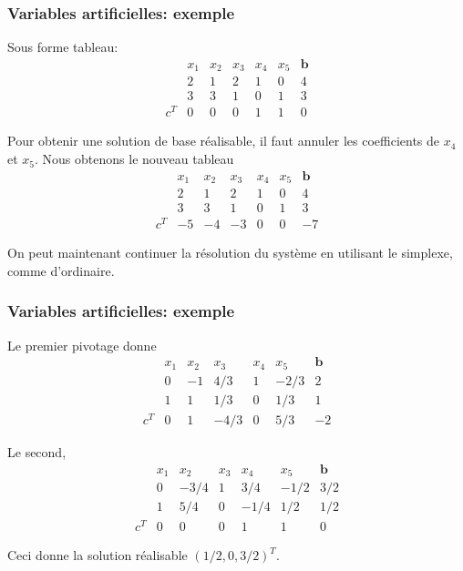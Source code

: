 \documentclass[usepdftitle=false]{beamer}
\def\bb{\boldsymbol{b}}
\begin{document}
\begin{frame}
\frametitle{Variables artificielles: exemple}

Sous forme tableau:
\[
\begin{matrix}
& x_1 & x_2 & x_3 & x_4 & x_5 & \bb \\
& 2 & 1 & 2 & 1 & 0 & 4 \\
& 3 & 3 & 1 & 0 & 1 & 3 \\
c^T & 0 & 0 & 0 & 1 & 1 & 0
\end{matrix}
\]

Pour obtenir une solution de base réalisable, il faut annuler les coefficients de $x_4$ et $x_5$.
Nous obtenons le nouveau tableau
\[
\begin{matrix}
& x_1 & x_2 & x_3 & x_4 & x_5 & \bb \\
& 2 & 1 & 2 & 1 & 0 & 4 \\
& 3 & 3 & 1 & 0 & 1 & 3 \\
c^T & -5 & -4 & -3 & 0 & 0 & -7
\end{matrix}
\]

\mbox{}

On peut maintenant continuer la résolution du système en utilisant le simplexe, comme d'ordinaire.

\end{frame}

\begin{frame}
\frametitle{Variables artificielles: exemple}

Le premier pivotage donne
\[
\begin{matrix}
& x_1 & x_2 & x_3 & x_4 & x_5 & \bb \\
& 0 & -1 & 4/3 & 1 & -2/3 & 2 \\
& 1 & 1 & 1/3 & 0 & 1/3 & 1 \\
c^T & 0 & 1 & -4/3 & 0 & 5/3 & -2
\end{matrix}
\]

\mbox{}

Le second,
\[
\begin{matrix}
& x_1 & x_2 & x_3 & x_4 & x_5 & \bb \\
& 0 & -3/4 & 1 & 3/4 & -1/2 & 3/2 \\
& 1 & 5/4 & 0 & -1/4 & 1/2 & 1/2 \\
c^T & 0 & 0 & 0 & 1 & 1 & 0
\end{matrix}
\]

\mbox{}

Ceci donne la solution réalisable $(1/2,0,3/2)^T$.

\end{frame}
\end{document}
